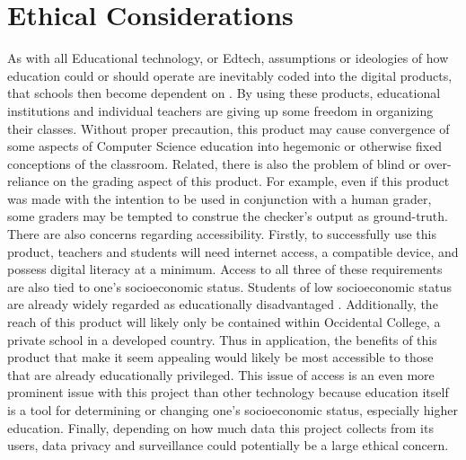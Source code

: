 \documentclass[10pt,twocolumn]{article}
\begin{document}
\section{Ethical Considerations}
As with all Educational technology, or Edtech, assumptions or ideologies of how education could or should operate are inevitably coded into the digital products, that schools then become dependent on \cite{williamson_2017}. By using these products, educational institutions and individual teachers are giving up some freedom in organizing their classes. Without proper precaution, this product may cause convergence of some aspects of Computer Science education into hegemonic or otherwise fixed conceptions of the classroom. Related, there is also the problem of blind or over-reliance on the grading aspect of this product. For example, even if this product was made with the intention to be used in conjunction with a human grader, some graders may be tempted to construe the checker's output as ground-truth. There are also concerns regarding accessibility. Firstly, to successfully use this product, teachers and students will need internet access, a compatible device, and possess digital literacy at a minimum. Access to all three of these requirements are also tied to one’s socioeconomic status. Students of low socioeconomic status are already widely regarded as educationally disadvantaged \cite{walpole_2003}. Additionally, the reach of this product will likely only be contained within Occidental College, a private school in a developed country. Thus in application, the benefits of this product that make it seem appealing would likely be most accessible to those that are already educationally privileged. This issue of access is an even more prominent issue with this project than other technology because education itself is a tool for determining or changing one's socioeconomic status, especially higher education. Finally, depending on how much data this project collects from its users, data privacy and surveillance could potentially be a large ethical concern. 
\end{document}
